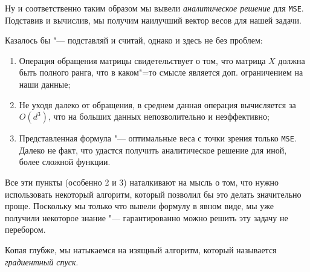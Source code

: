 Ну и соответственно таким образом мы вывели \textit{аналитическое решение} для \texttt{MSE}. Подставив и вычислив, мы получим наилучший вектор весов для нашей задачи. 

Казалось бы "--- подставляй и считай, однако и здесь не без проблем:
\begin{enumerate}
    \item Операция обращения матрицы свидетельствует о том, что матрица $X$ должна быть полного ранга, что в каком"=то смысле является доп. ограничением на наши данные;
    \item Не уходя далеко от обращения, в среднем данная операция вычисляется за $O(d^3)$, что на больших данных непозволительно и неэффективно;
    \item Представленная формула "--- оптимальные веса с точки зрения только \texttt{MSE}. Далеко не факт, что удастся получить аналитическое решение для иной, более сложной функции.
\end{enumerate}

Все эти пункты (особенно 2 и 3) наталкивают на мысль о том, что нужно использовать некоторый алгоритм, который позволил бы это делать значительно проще. Поскольку мы только что вывели формулу в явном виде, мы уже получили некоторое знание "--- гарантированно можно решить эту задачу не перебором.

Копая глубже, мы натыкаемся на изящный алгоритм, который называется 
\textit{градиентный спуск}.